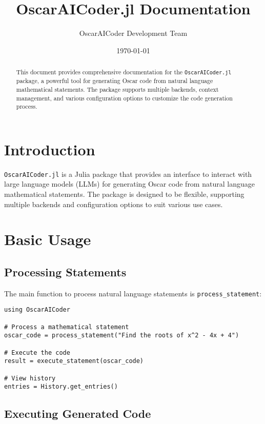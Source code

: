 \documentclass[11pt,a4paper]{article}
\title{OscarAICoder.jl Documentation}
\author{OscarAICoder Development Team}
\date{\today}
\newcommand{\func}[1]{\texttt{#1}}
\newcommand{\modname}[1]{\texttt{#1}}
\begin{document}
\maketitle
\thispagestyle{empty}

\begin{abstract}
  This document provides comprehensive documentation for the
  \modname{OscarAICoder.jl} package, a powerful tool for generating Oscar
  \cite{oscar_project} code from natural language mathematical statements. The
  package supports multiple backends, context management, and various
  configuration options to customize the code generation process.
\end{abstract}

\section{Introduction}
\label{sec:introduction}

\modname{OscarAICoder.jl} is a Julia package that provides an interface to interact with large language models (LLMs) for generating Oscar code from natural language mathematical statements. The package is designed to be flexible, supporting multiple backends and configuration options to suit various use cases.

\section{Basic Usage}
\label{sec:basic_usage}

\subsection{Processing Statements}

The main function to process natural language statements is \func{process\_statement}:

\begin{lstlisting}
using OscarAICoder

# Process a mathematical statement
oscar_code = process_statement("Find the roots of x^2 - 4x + 4")

# Execute the code
result = execute_statement(oscar_code)

# View history
entries = History.get_entries()
\end{lstlisting}

\subsection{Executing Generated Code}
\label{sec:executing_code}
\end{document}
